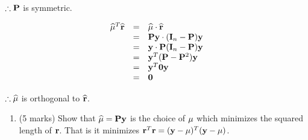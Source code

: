 \documentclass[9pt,letter]{article}
\providecommand{\tightlist}{%
  \setlength{\itemsep}{0pt}\setlength{\parskip}{0pt}}
\begin{document}
\(\therefore {\bf P}\) is symmetric.

\[
\begin{array}{rcl}
\widehat{\bf \mu}^T \widehat{\bf r} &= & \widehat{\bf \mu} \cdot \widehat{\bf r}\\
&= & {\bf P}{\bf y} \cdot ({\bf I}_n-{\bf P}){\bf y}\\
&= & {\bf y} \cdot{\bf P} ({\bf I}_n-{\bf P}){\bf y} \\
&= & {\bf y}^T({\bf P}-{\bf P}^2){\bf y}\\
&= & {\bf y}^T{\bf 0}{\bf y} \\
&= & {\bf 0} \\
\end{array}
\]

\(\therefore \widehat{\bf \mu}\) is orthogonal to \(\widehat{\bf r}\).

\begin{enumerate}
\def\labelenumi{(\alph{enumi})}
\setcounter{enumi}{4}
\tightlist
\item
  (5 marks) Show that \(\widehat{\bf \mu} = {\bf P} {\bf y}\) is the
  choice of \({\bf \mu}\) which minimizes the squared length of
  \({\bf r}\). That is it minimizes
  \({\bf r}^T{\bf r}=({\bf y} - {\bf \mu})^T({\bf y} - {\bf \mu})\).
\end{enumerate}
\end{document}
